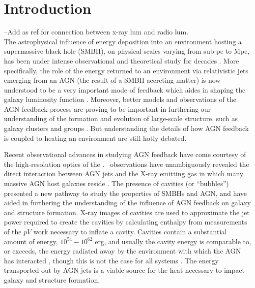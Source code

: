 \documentclass{emulateapj}
\begin{document}

\section{Introduction}
\label{sec:intro}

--Add \citet{2008ApJ...680..897D} as ref for connection between x-ray
lum and radio lum.\\

The astrophysical influence of energy deposition into an environment
hosting a supermassive black hole (SMBH), on physical scales varying
from sub-pc to Mpc, has been under intense observational and
theoretical study for decades \citep[\eg][]{1969Natur.223..690L,
  1974MNRAS.166..513S, cowie77, 1981ApJ...248...55B,
  1982MNRAS.199..883B, 1982MNRAS.200..115S, 1984ARA&A..22..471R,
  burns90, kaiser91, 1993MNRAS.263..323T, 1995MNRAS.276..663B,
  1997MNRAS.288..355B, magorrian, 1998A&A...331L...1S,
  2000ApJ...534L.135M, voitbryan, best05, haradent}. More
specifically, the role of the energy returned to an environment via
relativistic jets emerging from an AGN (the result of a SMBH accreting
matter) is now understood to be a very important mode of feedback
which aides in shaping the galaxy luminosity function \citep{croton06,
  bower06, saro06, sijacki07}. Moreover, better models and
observations of the AGN feedback process are proving to be important
in furthering our understanding of the formation and evolution of
large-scale structure, such as galaxy clusters and groups \citep[see,
  for example,][]{2008MNRAS.386.1309M, minggroups}. But understanding
the details of how AGN feedback is coupled to heating an environment
are still hotly debated.

Recent observational advances in studying AGN feedback have come
courtesy of the high-resolution optics of the
\cxo. \chandra\ observations have unambiguously revealed the direct
interaction between AGN jets and the X-ray emitting gas in which many
massive AGN host galaxies reside \citep[\eg][]{2000ApJ...534L.135M,
  perseus1, schindler01}. The presence of cavities (or ``bubbles'')
presented a new pathway to study the properties of SMBHs and AGN, and
have aided in furthering the understanding of the influence of AGN
feedback on galaxy and structure formation. X-ray images of cavities
are used to approximate the jet power required to create the cavities
by calculating enthalpy from measurements of the $pV$ work necessary
to inflate a cavity. Cavities contain a substantial amount of energy,
$10^{54}-10^{62}$ erg, and usually the cavity energy is comparable to,
or exceeds, the energy radiated away by the environment with which the
AGN has interacted \citep{birzan04, rafferty06}, though this is not
the case for all systems \citep{dunn08}. The energy transported out by
AGN jets is a viable source for the heat necessary to impact galaxy
and structure formation.
\end{document}
